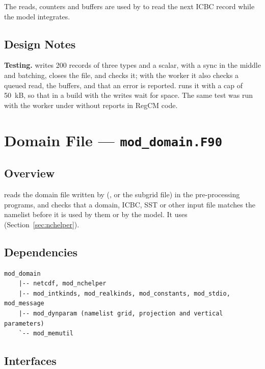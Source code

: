 \noindent The reads, counters and buffers are used by  to
read the next ICBC record while the model integrates.

\subsection{Design Notes}

\textbf{Testing.}  writes 200
records of three types and a scalar, with a sync in the middle and
batching, closes the file, and checks it; with the worker it also checks a
queued read, the buffers, and that an error is reported. 
runs it with a cap of 50~kB, so that in a build with
 the writes wait for space. The same test was
run with the worker under  without reports in
RegCM code.

\section{Domain File --- \texttt{mod\_domain.F90}}
\label{sec:domain}

\subsection{Overview}

 reads the domain file written by 
(, or the subgrid file) in the pre-processing programs,
and checks that a domain, ICBC, SST or other input file matches the
namelist before it is used by them or by the model. It uses
 (Section~\ref{sec:nchelper}).

\subsection{Dependencies}

\begin{lstlisting}
mod_domain
    |-- netcdf, mod_nchelper
    |-- mod_intkinds, mod_realkinds, mod_constants, mod_stdio, mod_message
    |-- mod_dynparam (namelist grid, projection and vertical parameters)
    `-- mod_memutil
\end{lstlisting}

\subsection{Interfaces}

